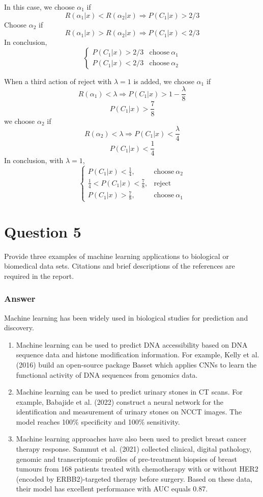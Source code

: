\documentclass{article}
\begin{document}
\noindent In this case, we choose $\alpha_1$ if $$R(\alpha_1|x) < R(\alpha_2|x) \Rightarrow P(C_1|x)>2/3$$
Choose $\alpha_2$ if $$R(\alpha_1|x) > R(\alpha_2|x) \Rightarrow P(C_1|x)<2/3$$
In conclusion,
$$
\begin{cases}
    P(C_1|x)>2/3& \text{choose}\:\alpha_1\\
    P(C_1|x)<2/3& \text{choose}\:\alpha_2
\end{cases}
$$

\noindent When a third action of reject with $\lambda = 1$ is added, we choose $\alpha_1$ if 
$$R(\alpha_1) < \lambda \Rightarrow P(C_1|x)>1-\frac{\lambda}{8}$$
$$P(C_1|x)>\frac{7}{8}$$
we choose $\alpha_2$ if $$R(\alpha_2) < \lambda \Rightarrow P(C_1|x)<\frac{\lambda}{4}$$
$$P(C_1|x)<\frac{1}{4}$$
In conclusion, with $\lambda=1$, 
$$
\begin{cases}
    P(C_1|x)<\frac{1}{4},& \text{choose}\:\alpha_2\\
    \frac{1}{4} < P(C_1|x) < \frac{7}{8},& \text{reject}\\
    P(C_1|x)>\frac{7}{8},& \text{choose}\:\alpha_1
\end{cases}
$$

\section*{Question 5}
Provide three examples of machine learning applications to biological or biomedical data sets. Citations and brief descriptions of the references are required in the report. 

\subsubsection*{Answer}
Machine learning has been widely used in biological studies for prediction and discovery.

\begin{enumerate}
    \item Machine learning can be used to predict DNA accessibility based on DNA sequence data and histone modification information. For example, Kelly et al. (2016) build an open-source package Basset which applies CNNs to learn the functional activity of DNA sequences from genomics data. 
    \item Machine learning can be used to predict urinary stones in CT scans. For example, Babajide et al. (2022) construct a neural network for the identification and measurement of urinary stones on NCCT images. The model reaches 100\% specificity and 100\% sensitivity.
    \item Machine learning approaches have also been used to predict breast cancer therapy response. Sammut et al. (2021) collected clinical, digital pathology, genomic and transcriptomic profiles of pre-treatment biopsies of breast tumours from 168 patients treated with chemotherapy with or without HER2 (encoded by ERBB2)-targeted therapy before surgery. Based on these data, their model has excellent performance with AUC equals 0.87.
\end{enumerate}
\end{document}
